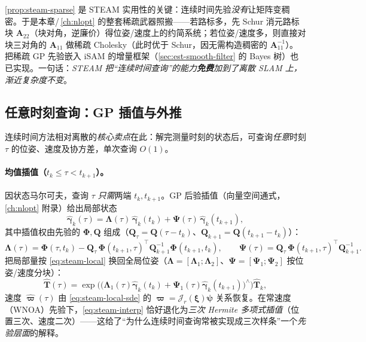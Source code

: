 \begin{insight}
\cref{prop:steam-sparse} 是 STEAM 实用性的关键：连续时间先验\emph{没有}让矩阵变稠密。于是本章/\,\cref{ch:nlopt} 的整套稀疏武器照搬——若路标多，先 Schur 消元路标块 $\mathbf{A}_{22}$（块对角，逆廉价）得位姿/速度上的约简系统；若位姿/速度多，则直接对块三对角的 $\mathbf{A}_{11}$ 做稀疏 Cholesky（此时优于 Schur，因无需构造稠密的 $\mathbf{A}_{11}^{-1}$）。把稀疏 GP 先验嵌入 iSAM 的增量框架（\cref{sec:est-smooth-filter} 的 Bayes 树）也已实现\cite{anderson2015steam}。一句话：\emph{STEAM 把“连续时间查询”的能力\textbf{免费}加到了离散 SLAM 上，渐近复杂度不变}。
\end{insight}

\subsection{任意时刻查询：GP 插值与外推}
\label{sec:est-steam-query}

连续时间方法相对离散的\emph{核心卖点}在此：解完测量时刻的状态后，可查询\emph{任意}时刻 $\tau$ 的位姿、速度及协方差，单次查询 $O(1)$。

\paragraph{均值插值（$t_k\le\tau<t_{k+1}$）。}
因状态马尔可夫，查询 $\tau$ \emph{只需}两端 $t_k,t_{k+1}$。GP 后验插值（向量空间通式，\cref{ch:nlopt} 附录）给出局部状态
\begin{equation}
  \hat{\boldsymbol{\gamma}}_k(\tau)=\boldsymbol{\Lambda}(\tau)\,\hat{\boldsymbol{\gamma}}_k(t_k)+\boldsymbol{\Psi}(\tau)\,\hat{\boldsymbol{\gamma}}_k(t_{k+1}),
  \label{eq:steam-interp}
\end{equation}
其中插值权由先验的 $\boldsymbol{\Phi},\mathbf{Q}$ 组成（$\mathbf{Q}_\tau=\mathbf{Q}(\tau-t_k)$、$\mathbf{Q}_{k+1}=\mathbf{Q}(t_{k+1}-t_k)$）：
\begin{equation}
  \boldsymbol{\Lambda}(\tau)=\boldsymbol{\Phi}(\tau,t_k)-\mathbf{Q}_\tau\,\boldsymbol{\Phi}(t_{k+1},\tau)^\top\mathbf{Q}_{k+1}^{-1}\boldsymbol{\Phi}(t_{k+1},t_k),\qquad
  \boldsymbol{\Psi}(\tau)=\mathbf{Q}_\tau\,\boldsymbol{\Phi}(t_{k+1},\tau)^\top\mathbf{Q}_{k+1}^{-1}.
  \label{eq:steam-LambdaPsi}
\end{equation}
把局部量按 \cref{eq:steam-local} 换回全局位姿（$\boldsymbol{\Lambda}=[\boldsymbol{\Lambda}_1;\boldsymbol{\Lambda}_2]$、$\boldsymbol{\Psi}=[\boldsymbol{\Psi}_1;\boldsymbol{\Psi}_2]$ 按位姿/速度分块）：
\begin{equation}
  \hat{\mathbf{T}}(\tau)=\exp\!\Big(\big(\boldsymbol{\Lambda}_1(\tau)\hat{\boldsymbol{\gamma}}_k(t_k)+\boldsymbol{\Psi}_1(\tau)\hat{\boldsymbol{\gamma}}_k(t_{k+1})\big)^\wedge\Big)\hat{\mathbf{T}}_k,
  \label{eq:steam-Tquery}
\end{equation}
速度 $\hat{\boldsymbol{\varpi}}(\tau)$ 由 \cref{eq:steam-local-sde} 的 $\boldsymbol{\varpi}=\boldsymbol{\mathcal{J}}_r(\boldsymbol{\xi})\boldsymbol{\psi}$ 关系恢复。在常速度（WNOA）先验下，\cref{eq:steam-interp} 恰好退化为\emph{三次 Hermite 多项式插值}（位置三次、速度二次）——这给了“为什么连续时间查询常被实现成三次样条”一个\emph{先验层面}的解释。

